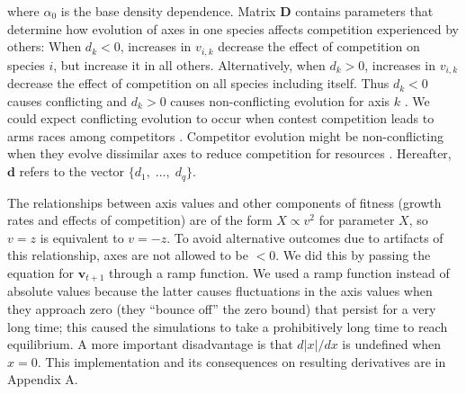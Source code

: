 \noindent where $\alpha_0$ is the base density dependence.
Matrix $\mathbf{D}$ contains parameters that determine how evolution of axes
in one species affects competition experienced by others:
When $d_k < 0$, increases in $v_{i,k}$ decrease the
effect of competition on species $i$, but increase it in all others.
Alternatively, when $d_k > 0$, increases in $v_{i,k}$ decrease the effect of
competition on all species including itself.
Thus $d_k < 0$ causes conflicting and $d_k > 0$ causes non-conflicting evolution
for axis $k$ \citep{Northfield:2013if}.
We could expect conflicting evolution to occur when contest competition
leads to arms races among competitors
\citep{Abrams:1994th}.
Competitor evolution might be non-conflicting when they evolve
dissimilar axes to reduce competition for resources \citep{Roughgarden:1976eh}.
Hereafter, $\mathbf{d}$ refers to the vector $\{d_1, \; \ldots, \; d_q \}$.


The relationships between axis values and other components of fitness
(growth rates and effects of competition) are of the form
$X \propto v^2$ for parameter $X$, so $v = z$ is equivalent to $v = -z$.
To avoid alternative outcomes due to artifacts of this relationship,
axes are not allowed to be $< 0$.
We did this by passing the equation for $\mathbf{v}_{t+1}$ through a
ramp function.
We used a ramp function instead of absolute values
because the latter causes fluctuations
in the axis values when they approach zero (they ``bounce off''
the zero bound) that persist for a very long time;
this caused the simulations to take a prohibitively long time to reach
equilibrium.
A more important disadvantage is that $d \lvert x \rvert / dx$ is
undefined when $x = 0$.
This implementation and its consequences on resulting derivatives are in
Appendix A.




%


